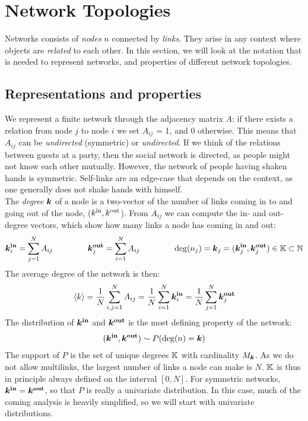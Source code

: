\newpage
\section{Network Topologies} \label{sec:NetworkTopologies}

Networks consists of \textsl{nodes} $n$ connected by \textsl{links}. They arise in any context where objects are \textsl{related} to each other. In this section, we will look at the notation that is needed to represent networks, and properties of different network topologies.

\subsection{Representations and properties}
We represent a finite network through the adjacency matrix $A$: if there exists a relation from node $j$ to node $i$ we set $A_{ij} $ = 1, and 0 otherwise. This means that $A_{ij}$ can be \textsl{undirected} (symmetric) or \textsl{undirected}. If we think of the relations between guests at a party, then the social network is directed, as people might not know each other mutually. However, the network of people having shaken hands is symmetric. Self-links are an edge-case that depends on the context, as one generally does not shake hands with himself. \\
The \textsl{degree} ${\boldsymbol{k}}$ of a node is a two-vector of the number of links coming in to and going out of the node, (${k^{\rm in}}, {k^{\rm out}}$). From $A_{ij}$ we can compute the in- and out-degree vectors, which show how many links a node has coming in and out:
\begin{align}
\kinbi = \sum_{j=1}^{N} A_{i j} \hspace{15mm} \koutbj = \sum_{i=1}^{N} A_{i j}  \hspace{15mm} \degree(n_j) = \k_j = (\boldsymbol{k}_j^{\bf in}, \koutbj) \in \K \subset \mathbb{N} \label{eq:definekinkoutfromA} 
\end{align}
The average degree of the network is then: 
\begin{align}
{\langle k\rangle} = \frac{1}{N} \sum_{i,j=1}^{N} A_{ij} = \frac{1}{N} \sum_{i=1}^{N} {\boldsymbol{k}_i^{\bf in}} = \frac{1}{N} \sum_{j=1}^{N} {\boldsymbol{k}_j^{\bf out}} \label{eq:kmean} 
\end{align}
The distribution of ${\boldsymbol{k^{\rm in}}}$ and $\boldsymbol{{k^{\rm out}}}$ is the most defining property of the network:
\begin{align}
({\boldsymbol{k^{\rm in}}}, \boldsymbol{{k^{\rm out}}}) \sim P({\rm deg}(n) = {\boldsymbol{k}}) \label{eq:definekinkoutfromP} 
\end{align}
The support of $P$ is the set of unique degrees ${\mathbb{K}}$ with cardinality $M_{\boldsymbol{k}}$. As we do not allow multilinks, the largest number of links a node can make is $N$. ${\mathbb{K}}$ is thus in principle always defined on the interval $[0,N]$. For symmetric networks, ${\boldsymbol{k^{\rm in}}} = \boldsymbol{{k^{\rm out}}}$, so that $P$ is really a univariate distribution. In this case, much of the coming analysis is heavily simplified, so we will start with univariate distributions.


